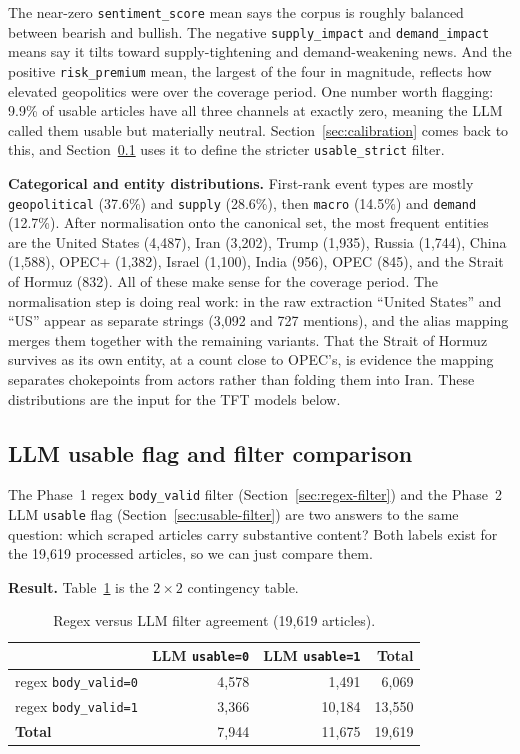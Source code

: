 The near-zero \texttt{sentiment\_score} mean says the corpus is roughly balanced between bearish and bullish. The negative \texttt{supply\_impact} and \texttt{demand\_impact} means say it tilts toward supply-tightening and demand-weakening news. And the positive \texttt{risk\_premium} mean, the largest of the four in magnitude, reflects how elevated geopolitics were over the coverage period. One number worth flagging: 9.9\% of usable articles have all three channels at exactly zero, meaning the LLM called them usable but materially neutral. Section~\ref{sec:calibration} comes back to this, and Section~\ref{sec:filter-comparison} uses it to define the stricter \texttt{usable\_strict} filter.

\textbf{Categorical and entity distributions.} First-rank event types are mostly \texttt{geopolitical} (37.6\%) and \texttt{supply} (28.6\%), then \texttt{macro} (14.5\%) and \texttt{demand} (12.7\%). After normalisation onto the canonical set, the most frequent entities are the United States (4{,}487), Iran (3{,}202), Trump (1{,}935), Russia (1{,}744), China (1{,}588), OPEC+ (1{,}382), Israel (1{,}100), India (956), OPEC (845), and the Strait of Hormuz (832). All of these make sense for the coverage period. The normalisation step is doing real work: in the raw extraction ``United States'' and ``US'' appear as separate strings (3{,}092 and 727 mentions), and the alias mapping merges them together with the remaining variants. That the Strait of Hormuz survives as its own entity, at a count close to OPEC's, is evidence the mapping separates chokepoints from actors rather than folding them into Iran. These distributions are the input for the TFT models below.

\subsection{LLM usable flag and filter comparison}\label{sec:filter-comparison}

The Phase~1 regex \texttt{body\_valid} filter (Section~\ref{sec:regex-filter}) and the Phase~2 LLM \texttt{usable} flag (Section~\ref{sec:usable-filter}) are two answers to the same question: which scraped articles carry substantive content? Both labels exist for the 19{,}619 processed articles, so we can just compare them.

\textbf{Result.} Table~\ref{tab:filter-contingency} is the $2 \times 2$ contingency table.

\begin{table}[h]
  \centering
  \caption{Regex versus LLM filter agreement (19{,}619 articles).}
  \label{tab:filter-contingency}
  \begin{tabular}{@{}lrrr@{}}
    \toprule
    & LLM \texttt{usable=0} & LLM \texttt{usable=1} & \textbf{Total} \\
    \midrule
    regex \texttt{body\_valid=0} & 4{,}578 & 1{,}491 & 6{,}069 \\
    regex \texttt{body\_valid=1} & 3{,}366 & 10{,}184 & 13{,}550 \\
    \textbf{Total} & 7{,}944 & 11{,}675 & 19{,}619 \\
    \bottomrule
  \end{tabular}
\end{table}

